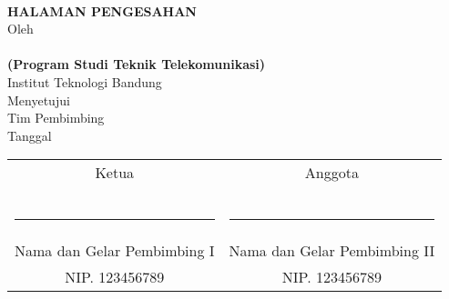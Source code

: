 \clearpage

\begin{center}    
	\renewcommand{\baselinestretch}{1}
    \large{\bfseries \MakeUppercase{\thetitle}}
    \\[2\baselineskip]

\large{\bfseries HALAMAN PENGESAHAN}
    \\[\baselineskip]

    \normalsize{Oleh\\
    	\textbf{\theauthor}\\
    	\textbf{(Program Studi Teknik Telekomunikasi)}
    	\\[\baselineskip]
    	Institut Teknologi Bandung}
    \\[3\baselineskip]
    
    
    \normalsize{Menyetujui\\
    	Tim Pembimbing
    	\\[\baselineskip]
    	Tanggal \thedate}
    \\[5\baselineskip]
    
    \normalsize{%
    \setlength{\tabcolsep}{12pt}
    \begin{tabular}{c@{\hskip 0.5in}c}
        Ketua & Anggota \\
        & \\
        & \\
        & \\
        \rule{5cm}{0.4pt} & \rule{5cm}{0.4pt} \\
        Nama dan Gelar Pembimbing I & Nama dan Gelar Pembimbing II \\
        NIP. 123456789 & NIP. 123456789 \\
    \end{tabular}
    }

\end{center}
\clearpage
